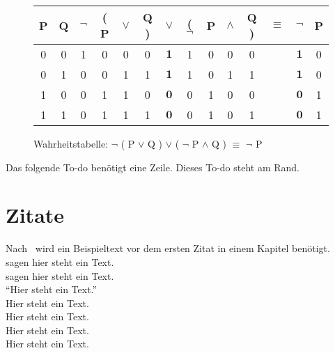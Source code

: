 \begin{figure}[!ht]
    \begin{center}
        \begin{tabular}{|c|c||c|c|c|c|c|c|c|c|c||c||c|c|}
            \hline
            P & Q & $\neg$ & ( P & $\vee$ & Q ) & $\vee$       & ( $\neg$ & P & $\wedge$ & Q ) & $\equiv$ & $\neg$       & P \\ \hline \hline
            0 & 0 & 1      & 0   & 0      & 0   & $\mathbf{1}$ & 1        & 0 & 0        & 0   &          & $\mathbf{1}$ & 0 \\ \hline
            0 & 1 & 0      & 0   & 1      & 1   & $\mathbf{1}$ & 1        & 0 & 1        & 1   &          & $\mathbf{1}$ & 0 \\ \hline
            1 & 0 & 0      & 1   & 1      & 0   & $\mathbf{0}$ & 0        & 1 & 0        & 0   &          & $\mathbf{0}$ & 1 \\ \hline
            1 & 1 & 0      & 1   & 1      & 1   & $\mathbf{0}$ & 0        & 1 & 0        & 1   &          & $\mathbf{0}$ & 1 \\ \hline
        \end{tabular}
        \caption{Wahrheitstabelle: $\neg$ ( P $\vee$ Q ) $\vee$ ( $\neg$ P $\wedge$ Q ) $\equiv$ $\neg$ P}\label{fig:figureFormulaTable}
    \end{center}
\end{figure}

Das folgende To-do  benötigt eine Zeile.
Dieses To-do  steht am Rand.


\section{Zitate}\label{sec:zitate}
Nach~\cite{Bartels2008} wird ein Beispieltext vor dem ersten Zitat in einem Kapitel benötigt.\\
\textcite{Yoshida1999} sagen hier steht ein Text. \\
\textcite*{Burns2003} sagen hier steht ein Text. \\
"`Hier steht ein Text."'~\autocite{Bartels2008} \\
Hier steht ein Text.~\autocite[Vgl.][]{Bartels2008} \\
Hier steht ein Text.~\autocite[][S. 200]{Bruno2009} \\
Hier steht ein Text.~\autocite*[][S. 200]{Bruno2009} \\
Hier steht ein Text.~\autocite{Wikipedia2011, Bruno2009}


